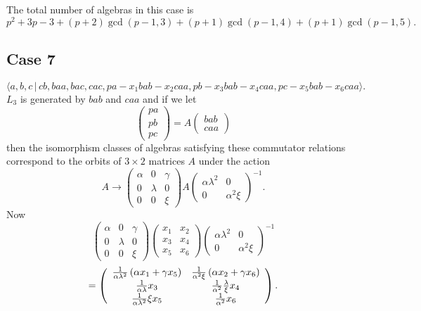\documentclass[10pt,thmsa]{article}
\begin{document}
The total number of algebras in this case is 
\[
p^2+3p-3+(p+2)\gcd (p-1,3)+(p+1)\gcd (p-1,4)+(p+1)\gcd (p-1,5). 
\]

\subsection{Case 7}

\[
\langle
a,b,c\,|%
\,cb,baa,bac,cac,pa-x_{1}bab-x_{2}caa,pb-x_{3}bab-x_{4}caa,pc-x_{5}bab-x_{6}caa\rangle . 
\]%
$L_{3}$ is generated by $bab$ and $caa$ and if we let 
\[
\left( 
\begin{array}{l}
pa \\ 
pb \\ 
pc%
\end{array}%
\right) =A\left( 
\begin{array}{l}
bab \\ 
caa%
\end{array}%
\right) 
\]%
then the isomorphism classes of algebras satisfying these commutator
relations correspond to the orbits of $3\times 2$ matrices $A$ under the
action 
\[
A\rightarrow \left( 
\begin{array}{lll}
\alpha & 0 & \gamma \\ 
0 & \lambda & 0 \\ 
0 & 0 & \xi%
\end{array}%
\right) A\left( 
\begin{array}{ll}
\alpha \lambda ^{2} & 0 \\ 
0 & \alpha ^{2}\xi%
\end{array}%
\right) ^{-1}. 
\]%
Now 
\[
\left( 
\begin{array}{lll}
\alpha & 0 & \gamma \\ 
0 & \lambda & 0 \\ 
0 & 0 & \xi%
\end{array}%
\right) \left( 
\begin{array}{cc}
x_{1} & x_{2} \\ 
x_{3} & x_{4} \\ 
x_{5} & x_{6}%
\end{array}%
\right) \left( 
\begin{array}{ll}
\alpha \lambda ^{2} & 0 \\ 
0 & \alpha ^{2}\xi%
\end{array}%
\right) ^{-1} 
\]
\[
=\left( 
\begin{array}{cc}
\frac{1}{\alpha \lambda ^{2}}\left( \alpha x_{1}+\gamma x_{5}\right) & \frac{%
1}{\alpha ^{2}\xi }\left( \alpha x_{2}+\gamma x_{6}\right) \\ 
\frac{1}{\alpha \lambda }x_{3} & \frac{1}{\alpha ^{2}}\frac{\lambda }{\xi }%
x_{4} \\ 
\frac{1}{\alpha \lambda ^{2}}\xi x_{5} & \frac{1}{\alpha ^{2}}x_{6}%
\end{array}%
\right) . 
\]%
$\allowbreak $
\end{document}
